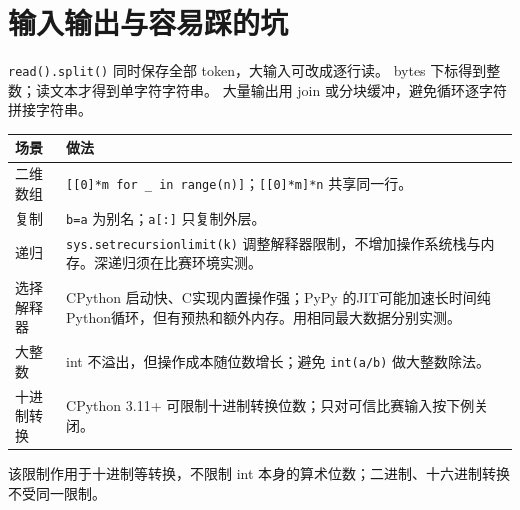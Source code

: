 \newpage
\section{输入输出与容易踩的坑}

\texttt{read().split()} 同时保存全部 token，大输入可改成逐行读。
bytes 下标得到整数；读文本才得到单字符字符串。
大量输出用 join 或分块缓冲，避免循环逐字符拼接字符串。
\begin{longtable}{p{43mm}p{116mm}}\toprule 场景 & 做法\\\midrule\endhead
二维数组 & \texttt{[[0]*m for \_ in range(n)]}；\texttt{[[0]*m]*n} 共享同一行。\\
复制 & \texttt{b=a} 为别名；\texttt{a[:]} 只复制外层。\\
递归 & \texttt{sys.setrecursionlimit(k)} 调整解释器限制，不增加操作系统栈与内存。深递归须在比赛环境实测。\\
选择解释器 & CPython 启动快、C实现内置操作强；PyPy 的JIT可能加速长时间纯Python循环，但有预热和额外内存。用相同最大数据分别实测。\\
大整数 & int 不溢出，但操作成本随位数增长；避免 \texttt{int(a/b)} 做大整数除法。\\
十进制转换 & CPython 3.11+ 可限制十进制转换位数；只对可信比赛输入按下例关闭。\\\bottomrule
\end{longtable}

该限制作用于十进制等转换，不限制 int 本身的算术位数；二进制、十六进制转换不受同一限制。

